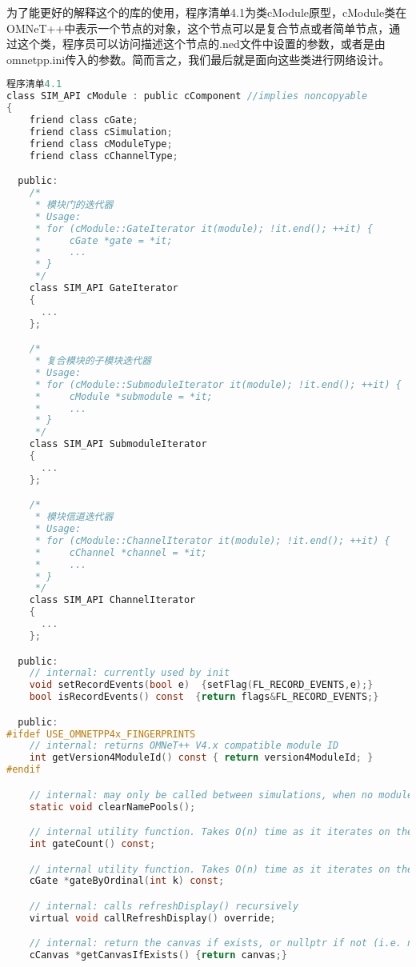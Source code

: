 为了能更好的解释这个的库的使用，程序清单4.1为类cModule原型，cModule类在OMNeT++中表示一个节点的对象，这个节点可以是复合节点或者简单节点，通过这个类，程序员可以访问描述这个节点的.ned文件中设置的参数，或者是由omnetpp.ini传入的参数。简而言之，我们最后就是面向这些类进行网络设计。

\begin{lstlisting}[language=c]
程序清单4.1
class SIM_API cModule : public cComponent //implies noncopyable
{
    friend class cGate;
    friend class cSimulation;
    friend class cModuleType;
    friend class cChannelType;

  public:
    /*
     * 模块门的迭代器
     * Usage:
     * for (cModule::GateIterator it(module); !it.end(); ++it) {
     *     cGate *gate = *it;
     *     ...
     * }
     */
    class SIM_API GateIterator
    {
      ...
    };

    /*
     * 复合模块的子模块迭代器
     * Usage:
     * for (cModule::SubmoduleIterator it(module); !it.end(); ++it) {
     *     cModule *submodule = *it;
     *     ...
     * }
     */
    class SIM_API SubmoduleIterator
    {
      ...
    };

    /*
     * 模块信道迭代器
     * Usage:
     * for (cModule::ChannelIterator it(module); !it.end(); ++it) {
     *     cChannel *channel = *it;
     *     ...
     * }
     */
    class SIM_API ChannelIterator
    {
      ...
    };

  public:
    // internal: currently used by init
    void setRecordEvents(bool e)  {setFlag(FL_RECORD_EVENTS,e);}
    bool isRecordEvents() const  {return flags&FL_RECORD_EVENTS;}

  public:
#ifdef USE_OMNETPP4x_FINGERPRINTS
    // internal: returns OMNeT++ V4.x compatible module ID
    int getVersion4ModuleId() const { return version4ModuleId; }
#endif

    // internal: may only be called between simulations, when no modules exist
    static void clearNamePools();

    // internal utility function. Takes O(n) time as it iterates on the gates
    int gateCount() const;

    // internal utility function. Takes O(n) time as it iterates on the gates
    cGate *gateByOrdinal(int k) const;

    // internal: calls refreshDisplay() recursively
    virtual void callRefreshDisplay() override;

    // internal: return the canvas if exists, or nullptr if not (i.e. no create-on-demand)
    cCanvas *getCanvasIfExists() {return canvas;}


\end{lstlisting}
